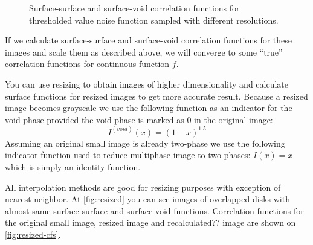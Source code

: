 \documentclass[reprint,amsmath,amssymb,aps,pre]{revtex4-1}
\begin{document}
\begin{figure}[ht]
  \centering
  \hfill
    \caption[]{Surface-surface and surface-void correlation functions for
      thresholded value noise function sampled with different resolutions.}
    \label{fig:scaling-noise}
\end{figure}

If we calculate surface-surface and surface-void correlation functions for these
images and scale them as described above, we will converge to some ``true''
correlation functions for continuous function $f$.

You can use resizing to obtain images of higher dimensionality and calculate
surface functions for resized images to get more accurate result. Because a
resized image becomes grayscale we use the following function as an indicator
for the void phase provided the void phase is marked as 0 in the original image:
\begin{equation*}
  I^{(void)}(x) = (1 - x)^{1.5}
\end{equation*}
Assuming an original small image is already two-phase we use the following
indicator function used to reduce multiphase image to two phases: $I(x) = x$
which is simply an identity function.

All interpolation methods are good for resizing purposes with exception of
nearest-neighbor. At \cref{fig:resized} you can see images of overlapped disks
with almost same surface-surface and surface-void functions. Correlation
functions for the original small image, resized image and recalculated?? image
are shown on \cref{fig:resized-cfs}.
\end{document}
